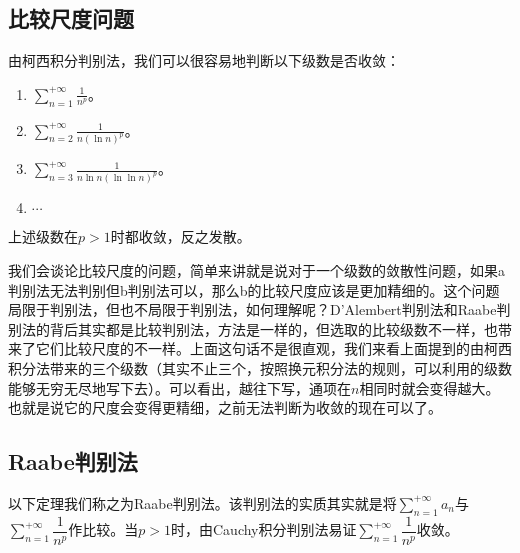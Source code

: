 \subsection{比较尺度问题}
由柯西积分判别法，我们可以很容易地判断以下级数是否收敛：
\begin{enumerate}
	\item $\sum\limits_{n=1}^{+\infty}\frac{1}{n^p}$。
	\item $\sum\limits_{n=2}^{+\infty}\frac{1}{n(\ln n)^p}$。
	\item $\sum\limits_{n=3}^{+\infty}\frac{1}{n\ln n(\ln\ln n)^p}$。
	\item $\cdots$
\end{enumerate}
上述级数在$p>1$时都收敛，反之发散。\par
我们会谈论比较尺度的问题，简单来讲就是说对于一个级数的敛散性问题，如果a判别法无法判别但b判别法可以，那么b的比较尺度应该是更加精细的。这个问题局限于判别法，但也不局限于判别法，如何理解呢？D'Alembert判别法和Raabe判别法的背后其实都是比较判别法，方法是一样的，但选取的比较级数不一样，也带来了它们比较尺度的不一样。上面这句话不是很直观，我们来看上面提到的由柯西积分法带来的三个级数（其实不止三个，按照换元积分法的规则，可以利用的级数能够无穷无尽地写下去）。可以看出，越往下写，通项在$n$相同时就会变得越大。也就是说它的尺度会变得更精细，之前无法判断为收敛的现在可以了。

\subsection{Raabe判别法}
以下定理我们称之为Raabe判别法。该判别法的实质其实就是将$\sum\limits_{n=1}^{+\infty}a_n$与$\sum\limits_{n=1}^{+\infty}\dfrac{1}{n^p}$作比较。当$p>1$时，由Cauchy积分判别法易证$\sum\limits_{n=1}^{+\infty}\dfrac{1}{n^p}$收敛。
